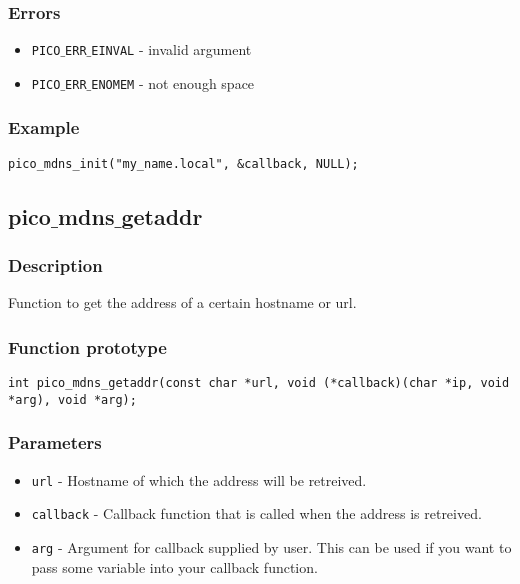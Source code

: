 \subsubsection*{Errors}
\begin{itemize}[noitemsep]
\item \texttt{PICO$\_$ERR$\_$EINVAL} - invalid argument
\item \texttt{PICO$\_$ERR$\_$ENOMEM} - not enough space
\end{itemize}

\subsubsection*{Example}
\begin{verbatim}
pico_mdns_init("my_name.local", &callback, NULL);
\end{verbatim}


\subsection{pico$\_$mdns$\_$getaddr}

\subsubsection*{Description}
Function to get the address of a certain hostname or url.

\subsubsection*{Function prototype}
\begin{verbatim}
int pico_mdns_getaddr(const char *url, void (*callback)(char *ip, void *arg), void *arg);
\end{verbatim}

\subsubsection*{Parameters}
\begin{itemize}[noitemsep]
\item \texttt{url} - Hostname of which the address will be retreived.
\item \texttt{callback} - Callback function that is called when the address is retreived.
\item \texttt{arg} - Argument for callback supplied by user. This can be used if you want to pass some variable into your callback function.
\end{itemize}

